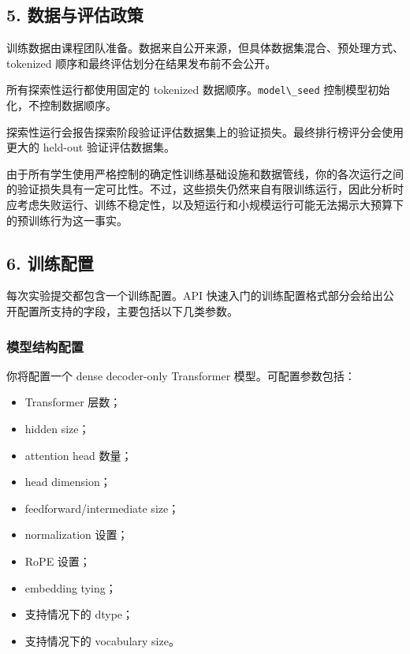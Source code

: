 \documentclass[
  11pt,
]{ctexart}
\newcommand{\passthrough}[1]{#1}
\providecommand{\tightlist}{%
  \setlength{\itemsep}{0pt}\setlength{\parskip}{0pt}}
\begin{document}
\hypertarget{ux6570ux636eux4e0eux8bc4ux4f30ux653fux7b56}{%
\subsection{5.
数据与评估政策}\label{ux6570ux636eux4e0eux8bc4ux4f30ux653fux7b56}}

训练数据由课程团队准备。数据来自公开来源，但具体数据集混合、预处理方式、tokenized
顺序和最终评估划分在结果发布前不会公开。

所有探索性运行都使用固定的 tokenized
数据顺序。\passthrough{\lstinline!model\_seed!}
控制模型初始化，不控制数据顺序。

探索性运行会报告探索阶段验证评估数据集上的验证损失。最终排行榜评分会使用更大的
held-out
验证评估数据集。

由于所有学生使用严格控制的确定性训练基础设施和数据管线，你的各次运行之间的验证损失具有一定可比性。不过，这些损失仍然来自有限训练运行，因此分析时应考虑失败运行、训练不稳定性，以及短运行和小规模运行可能无法揭示大预算下的预训练行为这一事实。

\hypertarget{ux8badux7ec3ux914dux7f6e}{%
\subsection{6. 训练配置}\label{ux8badux7ec3ux914dux7f6e}}

每次实验提交都包含一个训练配置。API
快速入门的训练配置格式部分会给出公开配置所支持的字段，主要包括以下几类参数。

\hypertarget{ux6a21ux578bux7ed3ux6784ux914dux7f6e}{%
\subsubsection{模型结构配置}\label{ux6a21ux578bux7ed3ux6784ux914dux7f6e}}

你将配置一个 dense decoder-only Transformer 模型。可配置参数包括：

\begin{itemize}
\tightlist
\item
  Transformer 层数；
\item
  hidden size；
\item
  attention head 数量；
\item
  head dimension；
\item
  feedforward/intermediate size；
\item
  normalization 设置；
\item
  RoPE 设置；
\item
  embedding tying；
\item
  支持情况下的 dtype；
\item
  支持情况下的 vocabulary size。
\end{itemize}
\end{document}

